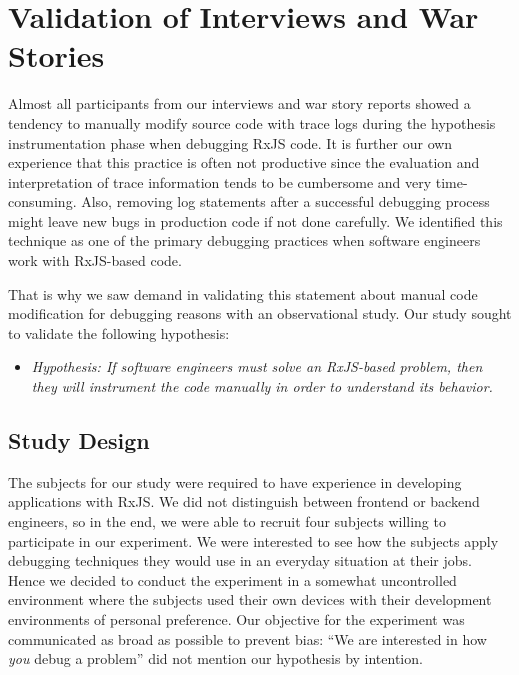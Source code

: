 \documentclass[12pt,a4paper]{article}
\begin{document}
\section{Validation of Interviews and War Stories}
\label{sec:study}

Almost all participants from our interviews and war story reports showed a tendency to manually modify source code with trace logs during the hypothesis instrumentation phase when debugging RxJS code. It is further our own experience that this practice is often not productive since the evaluation and interpretation of trace information tends to be cumbersome and very time-consuming. Also, removing log statements after a successful debugging process might leave new bugs in production code if not done carefully. We identified this technique as one of the primary debugging practices when software engineers work with RxJS-based code.

That is why we saw demand in validating this statement about manual code modification for debugging reasons with an observational study. Our study sought to validate the following hypothesis:

\begin{itemize}
	\item \emph{Hypothesis: If software engineers must solve an RxJS-based problem, then they will instrument the code manually in order to understand its behavior.}
\end{itemize}

\subsection{Study Design}

The subjects for our study were required to have experience in developing applications with RxJS. We did not distinguish between frontend or backend engineers, so in the end, we were able to recruit four subjects willing to participate in our experiment. We were interested to see how the subjects apply debugging techniques they would use in an everyday situation at their jobs. Hence we decided to conduct the experiment in a somewhat uncontrolled environment where the subjects used their own devices with their development environments of personal preference. Our objective for the experiment was communicated as broad as possible to prevent bias: ``We are interested in how \emph{you} debug a problem'' did not mention our hypothesis by intention.
\end{document}
